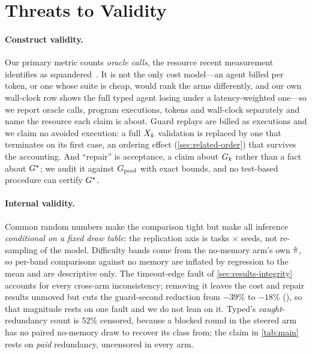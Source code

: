 \section{Threats to Validity}
\label{sec:threats}

\paragraph{Construct validity.}
Our primary metric counts \emph{oracle calls}, the resource recent measurement
identifies as squandered~\cite{lin2026run,chen2026rethinking}. It is not the
only cost model---an agent billed per token, or one whose suite is cheap, would
rank the arms differently, and our own wall-clock row shows the full typed
agent losing under a latency-weighted one---so we report oracle calls, program
executions, tokens and wall-clock separately and name the resource each claim
is about. Guard replays are billed as executions and we claim no avoided
execution: a full $X_{k}$ validation is replaced by one that terminates on its
first case, an ordering effect (\cref{sec:related-order}) that survives the
accounting. And ``repair'' is acceptance, a claim about $G_{k}$ rather than a
fact about $G^{\star}$; we audit it against $G_{\mathrm{pool}}$ with exact bounds, and no
test-based procedure can certify $G^{\star}$.

\paragraph{Internal validity.}
Common random numbers make the comparison tight but make all inference
\emph{conditional on a fixed draw table}: the replication axis is tasks
$\times$ seeds, not re-sampling of the model. Difficulty bands come from the
no-memory arm's own $\hat{\pi}$, so per-band comparisons against no memory are
inflated by regression to the mean and are descriptive only. The timeout-edge
fault of \cref{sec:results-integrity} accounts for every cross-arm
inconsistency; removing it leaves the cost and repair results unmoved but cuts
the guard-second reduction from $-39\%$ to $-18\%$
(), so that magnitude rests on one
fault and we do not lean on it. Typed's \emph{caught}-redundancy count is
$52\%$ censored, because a blocked round in the steered arm has no paired
no-memory draw to recover its class from; the claim in \cref{tab:main} rests on
\emph{paid} redundancy, uncensored in every arm.


